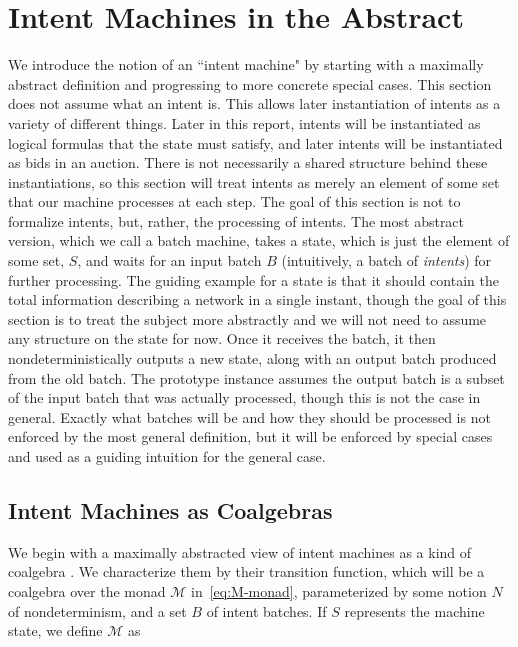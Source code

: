 \section{Intent Machines in the Abstract}\label{sec:abstract}

We introduce the notion of an ``intent machine" by starting with a maximally abstract definition and progressing to more concrete special cases. This section does not assume what an intent is. This allows later instantiation of intents as a variety of different things. Later in this report, intents will be instantiated as logical formulas that the state must satisfy, and later intents will be instantiated as bids in an auction. There is not necessarily a shared structure behind these instantiations, so this section will treat intents as merely an element of some set that our machine processes at each step. The goal of this section is not to formalize intents, but, rather, the processing of intents. The most abstract version, which we call a batch machine, takes a state, which is just the element of some set, $S$, and waits for an input batch $B$ (intuitively, a batch of \textit{intents}) for further processing. The guiding example for a state is that it should contain the total information describing a network in a single instant, though the goal of this section is to treat the subject more abstractly and we will not need to assume any structure on the state for now. Once it receives the batch, it then nondeterministically outputs a new state, along with an output batch produced from the old batch. The prototype instance assumes the output batch is a subset of the input batch that was actually processed, though this is not the case in general. Exactly what batches will be and how they should be processed is not enforced by the most general definition, but it will be enforced by special cases and used as a guiding intuition for the general case.

\subsection{Intent Machines as Coalgebras}

We begin with a maximally abstracted view of intent machines as a kind of coalgebra \citep{jacobs2017introduction}. We characterize them by their transition function, which will be a coalgebra over the monad $\mathcal{M}$ in~\eqref{eq:M-monad}, parameterized by some notion $N$ of nondeterminism, and a set $B$ of intent batches. If
$S$ represents the machine state, we define $\mathcal{M}$ as

